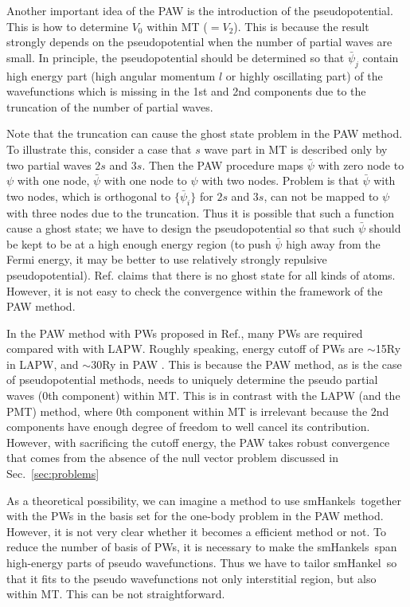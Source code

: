 \documentclass[a4paper,10pt,aip,onecolumn,amsmath,amssymb,floatfix,rmp]{revtex4-1}
\newcommand{\refsec}[1]{\mbox{Sec.~\!\ref{#1}}}
\def\smh{smHankel}
\def\smhs{smHankels}
\begin{document}
Another important idea of the PAW is the introduction of the
pseudopotential. This is how to determine $V_0$ within MT ($=V_2$).
This is because the result strongly depends on the pseudopotential
when the number of partial waves are small. In principle, the pseudopotential 
should be determined so that $\bar{\psi}_j$ contain high energy part 
(high angular momentum $l$ or highly oscillating part) of the wavefunctions
which is missing in the 1st and 2nd components due to the 
truncation of the number of partial waves.

Note that the truncation can cause the ghost state problem in the PAW method.
To illustrate this, consider a case that $s$ wave part in MT is described
only by two partial waves $2s$ and $3s$. Then the PAW procedure maps $\bar{\psi}$ with zero node to 
$\psi$ with one node, $\bar{\psi}$ with one node to $\psi$ with two nodes. 
Problem is that $\bar{\psi}$ with two nodes, which is orthogonal to $\{\bar{\psi}_i\}$ for $2s$ and $3s$,
can not be mapped to $\psi$ with three nodes due to the truncation. 
Thus it is possible that such a function cause a ghost state;
we have to design the pseudopotential so that such $\bar{\psi}$ should be
kept to be at a high enough energy region (to push $\bar{\psi}$ high away from the
Fermi energy, it may be better to use relatively strongly repulsive pseudopotential). 
Ref.\cite{kresse99} claims that there is no
ghost state for all kinds of atoms. However, it is not easy
to check the convergence within the framework of the PAW method.

In the PAW method with PWs proposed in Ref.\cite{kresse99}, many PWs are required
compared with with LAPW. Roughly speaking, energy cutoff of PWs are
$\sim$15Ry in LAPW, and $\sim$30Ry in PAW \cite{filippi94,kresse99}.
This is because the PAW method, as is the case of pseudopotential methods,
needs to uniquely determine the pseudo partial waves (0th component) within MT.
This is in contrast with the LAPW (and the PMT) method, 
where 0th component within MT is irrelevant because 
the 2nd components have enough degree of freedom to well cancel its contribution.
However, with sacrificing the cutoff energy,
the PAW takes robust convergence that comes from the absence of the 
null vector problem discussed in \refsec{sec:problems}

As a theoretical possibility, we can imagine a method to 
use \smhs\ together with the PWs in the basis set
for the one-body problem in the PAW method.
However, it is not very clear whether it becomes 
a efficient method or not. To reduce the number of basis of PWs, it is
necessary to make the \smhs\ span high-energy parts of pseudo
wavefunctions. Thus we have to tailor \smh\ so that it fits to the pseudo
wavefunctions not only interstitial region, but also within MT. 
This can be not straightforward.
\end{document}
